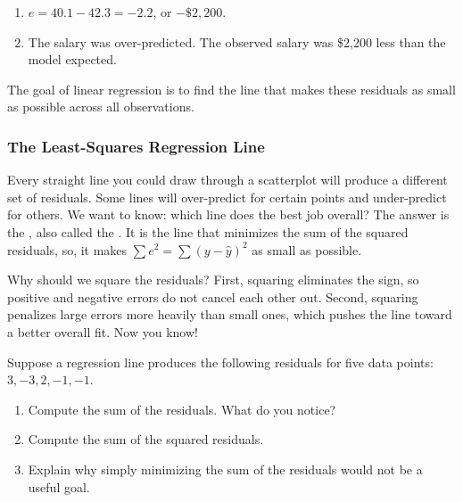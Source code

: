 \begin{Answer}[ref={ex:lr_residual}]
\begin{enumerate}
    \item $e = 40.1 - 42.3 = -2.2$, or $-\$2{,}200$.
    \item The salary was over-predicted. The observed salary was \$2{,}200 less
    than the model expected.
\end{enumerate}
\end{Answer}



The goal of linear regression is to find the line that makes these residuals as
small as possible across all observations.
   
\subsubsection{The Least-Squares Regression Line}

Every straight line you could draw through a scatterplot will produce a different
set of residuals. Some lines will over-predict for certain points and under-predict
for others. We want to know: which line does the best job overall? The answer is
the ,
also called the . It is the line
that minimizes the sum of the squared residuals, so, it makes
$\sum e^2 = \sum (y - \hat{y})^2$ as small as possible.

Why should we square the residuals? First, squaring eliminates the sign, so
positive and negative errors do not cancel each other out. Second, squaring
penalizes large errors more heavily than small ones, which pushes the line toward
a better overall fit. Now you know!

\begin{Exercise}[title={Why Square the Residuals?}, label={ex:lr_whysquare}]
Suppose a regression line produces the following residuals for five data points:
$3, -3, 2, -1, -1$.
\begin{enumerate}
    \item Compute the sum of the residuals. What do you notice?
    \item Compute the sum of the squared residuals.
    \item Explain why simply minimizing the sum of the residuals would not be a
    useful goal.
\end{enumerate}
\end{Exercise}

